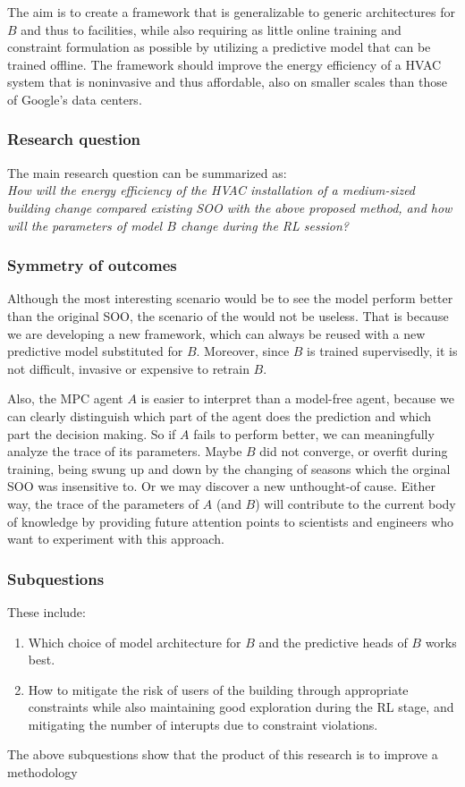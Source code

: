 \documentclass{article}
\theoremstyle{definition}
\theoremstyle{remark}
\begin{document}
The aim is to create a framework that is generalizable to generic architectures for $B$ and thus to facilities, while also requiring as little online training and constraint formulation as possible by utilizing a predictive model that can be trained offline. The framework should improve the energy efficiency of a HVAC system that is noninvasive and thus affordable, also on smaller scales than those of Google's data centers.

\subsubsection{Research question}

The main research question can be summarized as: \\
\textit{How will the energy efficiency of the HVAC installation of a medium-sized building change compared existing SOO with the above proposed method, and how will the parameters of model $B$ change during the RL session? }

\subsubsection{Symmetry of outcomes}
Although the most interesting scenario would be to see the model perform better than the original SOO, the scenario of the  would not be useless. That is because we are developing a new framework, which can always be reused with a new predictive model substituted for $B$. Moreover, since $B$ is trained supervisedly, it is not difficult, invasive or expensive to retrain $B$. 

Also, the MPC agent $A$ is easier to interpret than a model-free agent, because we can clearly distinguish which part of the agent does the prediction and which part the decision making. So if $A$ fails to perform better, we can meaningfully analyze the trace of its parameters. Maybe $B$ did not converge, or overfit during training, being swung up and down by the changing of seasons which the orginal SOO was insensitive to. Or we may discover a new unthought-of cause. Either way, the trace of the parameters of $A$ (and $B$) will contribute to the current body of knowledge by providing future attention points to scientists and engineers who want to experiment with this approach.

\subsubsection{Subquestions}
These include:
\begin{enumerate}
    \item Which choice of model architecture for $B$ and the predictive heads of $B$ works best.
    \item How to mitigate the risk of users of the building through appropriate constraints while also maintaining good exploration during the RL stage, and mitigating the number of interupts due to constraint violations.
\end{enumerate} 
The above subquestions show that the product of this research is to improve a methodology
\end{document}
